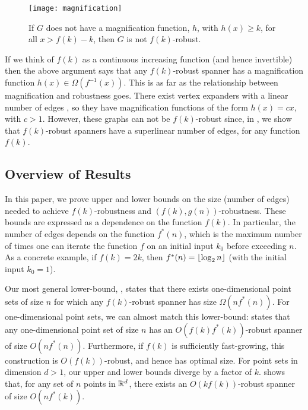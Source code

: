 \documentclass{patmorin}
\begin{document}
\begin{figure}
  \begin{center}
    \texttt{[image: magnification]}
  \end{center}
  \caption{If $G$ does not have a magnification function, $h$, with
  $h(x)\ge k$, for all $x> f(k)-k$, then $G$ is not $f(k)$-robust.}
\end{figure}

If we think of $f(k)$ as a continuous increasing function (and hence
invertible) then the above argument says that any $f(k)$-robust spanner
has a magnification function $h(x) \in \Omega(f^{-1}(x))$.  This is
as far as the relationship between magnification and robustness goes.
There exist vertex expanders with a linear number of edges \cite{hlw06},
so they have magnification functions of the form $h(x)=cx$, with
$c>1$.  However, these graphs can not be $f(k)$-robust since, in
, we show that $f(k)$-robust spanners
have a superlinear number of edges, for any function $f(k)$.


\subsection{Overview of Results}

In this paper, we prove upper and lower bounds on the size (number of
edges) needed to achieve $f(k)$-robustness and $(f(k),g(n))$-robustness.
These bounds are expressed as a dependence on the function $f(k)$.
In particular, the number of edges depends on the function $f^*(n)$,
which is the maximum number of times one can iterate the function $f$ on
an initial input $k_0$ before exceeding $n$.  As a concrete example, if
$f(k)=2k$, then  $f^*(n)={\lfloor \log_2 n \rfloor}$ (with the initial input $k_0=1$).

Our most general lower-bound, ,
states that there exists one-dimensional point sets of size $n$
for which any $f(k)$-robust spanner has size $\Omega(nf^*(n))$.
For one-dimensional point sets, we can almost match this lower-bound:
 states that any one-dimensional point set of
size $n$ has an $O(f(k)f^*(k))$-robust spanner of size $O(nf^*(n))$.
Furthermore, if $f(k)$ is sufficiently fast-growing, this construction
is $O(f(k))$-robust, and hence has optimal size.  For point sets in
dimension $d>1$, our upper and lower bounds diverge by a factor of $k$.
 shows that, for any set of $n$ points in $\mathbb{R}^d$, there exists
an $O(kf(k))$-robust spanner of size $O(nf^*(k))$.
\end{document}
